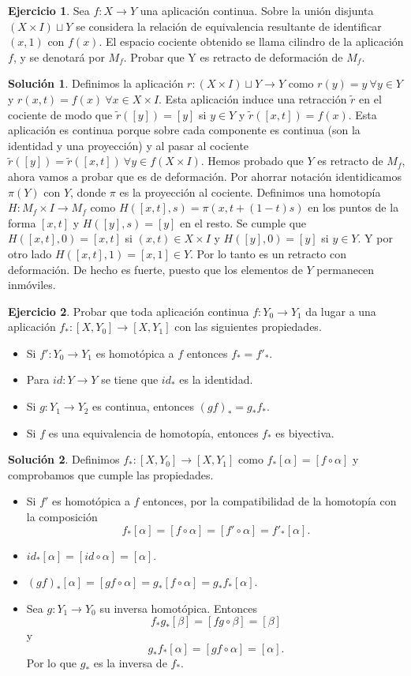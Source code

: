 \documentclass{article}
\theoremstyle{plain}
\theoremstyle{definition}
\newtheorem{exercise}{Ejercicio}
\newtheorem*{sol*}{Solución}
\begin{document}
\newpage
\begin{exercise}
Sea $f:X\to Y$ una aplicación continua. Sobre la unión disjunta $(X\times I)\sqcup Y$ se considera la relación de equivalencia resultante de identificar $(x,1)$ con $f(x)$. El espacio cociente obtenido se llama cilindro de la aplicación $f$, y se denotará por $M_f$. Probar que Y es retracto de deformación de $M_f$.
\end{exercise}
\begin{sol*}
Definimos la aplicación $r:(X\times I)\sqcup Y\to Y$ como $r(y)=y\ \forall y\in Y$ y $r(x,t)=f(x)\ \forall x\in X\times I$. Esta aplicación induce una retracción $\tilde{r}$ en el cociente de modo que $\tilde{r}([y])=[y]$ si $y\in Y$ y $\tilde{r}([x,t])=f(x)$. Esta aplicación es continua porque sobre cada componente es continua (son la identidad y una proyección) y al pasar al cociente $\tilde{r}([y])=\tilde{r}([x,t])\ \forall y\in f(X\times I)$. Hemos probado que $Y$ es retracto de $M_f$, ahora vamos a probar que es de deformación. Por ahorrar notación identidicamos $\pi(Y)$ con $Y$, donde $\pi$ es la proyección al cociente. Definimos una homotopía $H:M_f\times I \to M_f$ como $H([x,t],s)=\pi(x,t+(1-t)s)$ en los puntos de la forma $[x,t]$ y $H([y],s)=[y]$ en el resto. Se cumple que $H([x,t],0)=[x,t]$ si $(x,t)\in X\times I$ y $H([y],0)=[y]$ si $y\in Y$. Y por otro lado $H([x,t],1)=[x,1]\in Y$. Por lo tanto es un retracto con deformación. De hecho es fuerte, puesto que los elementos de $Y$ permanecen inmóviles.

\end{sol*}
\newpage
\begin{exercise}
Probar que toda aplicación continua $f:Y_0\to Y_1$ da lugar a una aplicación $f_*:[X,Y_0]\to[X,Y_1]$ con las siguientes propiedades.
\begin{itemize}
\item Si $f':Y_0\to Y_1$ es homotópica a $f$ entonces $f_* =f'_*$.
\item Para $id:Y\to Y$ se tiene que $id_*$ es la identidad.
\item Si $g:Y_1\to Y_2$ es continua, entonces $(gf)_* = g_*f_*$.
\item Si $f$ es una equivalencia de homotopía, entonces $f_*$ es biyectiva.
\end{itemize}
\end{exercise}
\begin{sol*}
Definimos $f_*:[X,Y_0]\to[X,Y_1]$ como $f_*[\alpha]=[f\circ\alpha]$ y comprobamos que cumple las propiedades. 
\begin{itemize}
\item Si $f'$ es homotópica a $f$ entonces, por la compatibilidad de la homotopía con la composición 
$$f_*[\alpha]=[f\circ\alpha]=[f'\circ\alpha]=f'_*[\alpha].$$
\item $id_*[\alpha]=[id\circ\alpha]=[\alpha]$.
\item $(gf)_*[\alpha]=[gf\circ\alpha]=g_*[f\circ\alpha]=g_*f_*[\alpha]$.
\item Sea $g:Y_1\to Y_0$ su inversa homotópica. Entonces
$$f_*g_*[\beta]=[fg\circ\beta]=[\beta]$$
y 
$$g_*f_*[\alpha]=[gf\circ\alpha]=[\alpha].$$
Por lo que $g_*$ es la inversa de $f_*$. 
\end{itemize}
\end{sol*}
\end{document}

